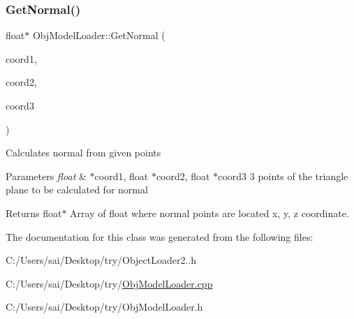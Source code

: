 \subsubsection{\texorpdfstring{Get\+Normal()}{GetNormal()}\hspace{0.1cm}{\footnotesize\ttfamily [3/3]}}
{\footnotesize\ttfamily float$\ast$ Obj\+Model\+Loader\+::\+Get\+Normal (\begin{DoxyParamCaption}\item[{float $\ast$}]{coord1,  }\item[{float $\ast$}]{coord2,  }\item[{float $\ast$}]{coord3 }\end{DoxyParamCaption})\hspace{0.3cm}{\ttfamily [private]}}

Calculates normal from given points


\begin{DoxyParams}{Parameters}
{\em float} & $\ast$coord1, float $\ast$coord2, float $\ast$coord3 3 points of the triangle plane to be calculated for normal\\
\hline
\end{DoxyParams}
\begin{DoxyReturn}{Returns}
float$\ast$ Array of float where normal points are located x, y, z coordinate. 
\end{DoxyReturn}


The documentation for this class was generated from the following files\+:\begin{DoxyCompactItemize}
\item 
C\+:/\+Users/sai/\+Desktop/try/Object\+Loader2..\+h\item 
C\+:/\+Users/sai/\+Desktop/try/\mbox{\hyperlink{_obj_model_loader_8cpp}{Obj\+Model\+Loader.\+cpp}}\item 
C\+:/\+Users/sai/\+Desktop/try/Obj\+Model\+Loader.\+h\end{DoxyCompactItemize}
